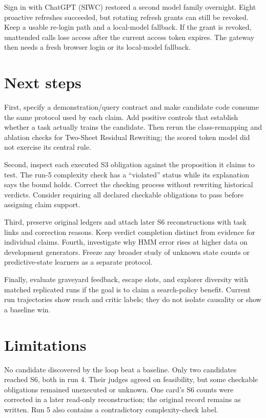 Sign in with ChatGPT (SIWC) restored a second model family overnight. Eight proactive refreshes succeeded, but rotating refresh grants can still be revoked. Keep a usable re-login path and a local-model fallback. If the grant is revoked, unattended calls lose access after the current access token expires. The gateway then needs a fresh browser login or its local-model fallback.

\section{Next steps}

First, specify a demonstration/query contract and make candidate code consume the same protocol used by each claim. Add positive controls that establish whether a task actually trains the candidate. Then rerun the class-remapping and ablation checks for Two-Sheet Residual Rewriting; the scored token model did not exercise its central rule.

Second, inspect each executed S3 obligation against the proposition it claims to test. The run-5 complexity check has a ``violated'' status while its explanation says the bound holds. Correct the checking process without rewriting historical verdicts. Consider requiring all declared checkable obligations to pass before assigning claim support.

Third, preserve original ledgers and attach later S6 reconstructions with task links and correction reasons. Keep verdict completion distinct from evidence for individual claims. Fourth, investigate why HMM error rises at higher data on development generators. Freeze any broader study of unknown state counts or predictive-state learners as a separate protocol.

Finally, evaluate graveyard feedback, escape slots, and explorer diversity with matched replicated runs if the goal is to claim a search-policy benefit. Current run trajectories show reach and critic labels; they do not isolate causality or show a baseline win.

\section{Limitations}

No candidate discovered by the loop beat a baseline. Only two candidates reached S6, both in run 4. Their judges agreed on feasibility, but some checkable obligations remained unexecuted or unknown. One card's S6 counts were corrected in a later read-only reconstruction; the original record remains as written. Run 5 also contains a contradictory complexity-check label.

